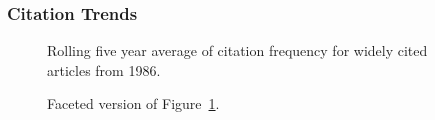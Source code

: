 \documentclass[
  10pt,
  letterpaper,
  DIV=11,
  numbers=noendperiod,
  twoside]{scrartcl}
\begin{document}
\subsubsection*{Citation Trends}\label{sec-trends-1986}

\begin{figure}


\caption{\label{fig-citation-spaghetti-1986}Rolling five year average of
citation frequency for widely cited articles from 1986.}

\end{figure}%

\begin{figure}


\caption{\label{fig-citation-facet-1986}Faceted version of
Figure~\ref{fig-citation-spaghetti-1986}.}

\end{figure}%
\end{document}
